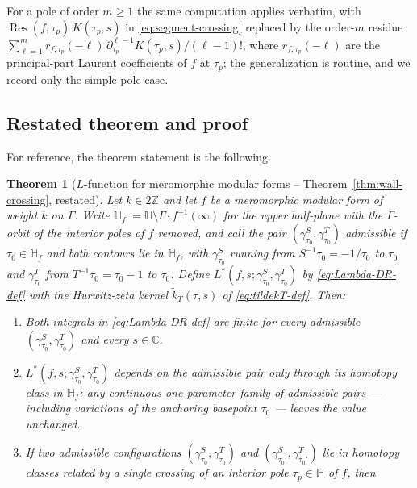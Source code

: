\documentclass[11pt]{article}
\newtheorem{theorem}{Theorem}[section]
\numberwithin{equation}{section}  %
\newcommand{\HH}{\mathbb{H}}
\newcommand{\ZZ}{\mathbb{Z}}
\newcommand{\CC}{\mathbb{C}}
\DeclareMathOperator{\Res}{Res}
\begin{document}
For a pole of order $m \ge 1$ the same computation applies verbatim,
with $\Res(f, \tau_p)\,K(\tau_p, s)$ in \eqref{eq:segment-crossing}
replaced by the order-$m$ residue
$\sum_{\ell = 1}^{m} r_{f, \tau_p}(-\ell)\,\partial_{\tau_p}^{\ell - 1} K(\tau_p, s)/(\ell - 1)!$,
where $r_{f, \tau_p}(-\ell)$ are the principal-part Laurent
coefficients of $f$ at $\tau_p$; the generalization is routine, and we
record only the simple-pole case.

\subsection{Restated theorem and proof}\label{subsec:wall-crossing-proof}

For reference, the theorem statement is the following.

\begin{theorem}[$L$-function for meromorphic modular forms -- Theorem~\ref{thm:wall-crossing}, restated]\label{thm:wall-crossing2}
Let $k \in 2\ZZ$ and let $f$ be a meromorphic modular form of weight
$k$ on $\Gamma$.  Write $\HH_f := \HH \setminus \Gamma\cdot
f^{-1}(\infty)$ for the upper half-plane with the $\Gamma$-orbit of
the interior poles of $f$ removed, and call the pair
$(\gamma^S_{\tau_0}, \gamma^T_{\tau_0})$ \emph{admissible} if
$\tau_0 \in \HH_f$ and both contours lie in $\HH_f$, with
$\gamma^S_{\tau_0}$ running from $S^{-1}\tau_0 = -1/\tau_0$ to $\tau_0$
and $\gamma^T_{\tau_0}$ from $T^{-1}\tau_0 = \tau_0 - 1$ to $\tau_0$.
Define $L^*(f, s; \gamma^S_{\tau_0}, \gamma^T_{\tau_0})$ by
\eqref{eq:Lambda-DR-def} with the Hurwitz-zeta kernel
$\widetilde{k}_T(\tau, s)$ of \eqref{eq:tildekT-def}.  Then:
\begin{enumerate}[label=(\alph*),leftmargin=2em]\itemsep0.25em
\item Both integrals in \eqref{eq:Lambda-DR-def} are finite for every
  admissible $(\gamma^S_{\tau_0}, \gamma^T_{\tau_0})$ and every $s \in
  \CC$.
\item $L^*(f, s; \gamma^S_{\tau_0}, \gamma^T_{\tau_0})$ depends on the
  admissible pair only through its homotopy class in $\HH_f$: any
  continuous one-parameter family of admissible pairs --- including
  variations of the anchoring basepoint $\tau_0$ --- leaves the value
  unchanged.
\item If two admissible configurations $(\gamma^S_{\tau_0},
  \gamma^T_{\tau_0})$ and $(\gamma^S_{\tau_0'}, \gamma^T_{\tau_0'})$ lie
  in homotopy classes related by a single crossing of an interior
  pole $\tau_p \in \HH$ of $f$, then

\end{enumerate}
\end{theorem}
\end{document}
